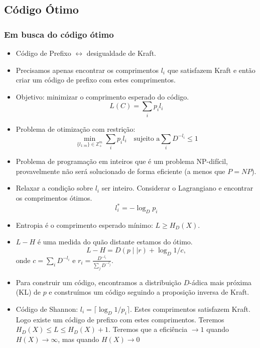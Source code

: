 \subsection{Código Ótimo}

\begin{frame}[allowframebreaks]
  \frametitle{Em busca do código ótimo}
  \begin{itemize}
  \item Código de Prefixo $\leftrightarrow$ desigualdade de Kraft.
  \item Precisamos apenas encontrar os comprimentos $l_i$ que satisfazem Kraft e então
	criar um código de prefixo com estes comprimentos.
  \item Objetivo: minimizar o comprimento esperado do código.
	\begin{equation}
	L(C) = \sum_i p_i l_i
	\end{equation}
  \item Problema de otimização com restrição:
	\begin{equation}
	\min_{ \{ l_{1:m} \} \in \mathbb{Z}_{+}^m  } \sum_i p_i l_i \quad \text{sujeito a} \sum_i D^{-l_i} \leq 1 
	\end{equation}
  \item Problema de programação em inteiros que é um problema NP-difícil, provavelmente não será
	solucionado de forma eficiente (a menos que $P=NP$).
  \item Relaxar a condição sobre $l_i$ ser inteiro. Considerar o Lagrangiano e encontrar os comprimentos ótimos.
	\begin{equation}
	l_i^\ast = -\log_D p_i
	\end{equation}
  \item Entropia é o comprimento esperado mínimo: $L \geq H_D (X)$.
  \item $L-H$ é uma medida do quão distante estamos do ótimo.
	\begin{equation}
	L-H = D(p \mid \mid r) + \log_D 1/c , 
	\end{equation}
	onde $c = \sum_i D^{-l_i}$ e $r_i = \frac{D^{-l_i}}{\sum_j D^{-l_j}}$.
  \item Para construir um código, encontramos a distribuição $D$-ádica mais próxima (KL) de $p$ e construímos
	um código seguindo a proposição inversa de Kraft.
  \item Código de Shannon: $l_i = \lceil \log_D 1/p_i \rceil$. Estes comprimentos satisfazem Kraft. Logo existe
	um código de prefixo com estes comprimentos. Teremos $H_D(X) \leq L \leq H_D(X) + 1$.
	Teremos que a eficiência $\rightarrow 1$ quando $H(X) \rightarrow \infty$, mas quando $H(X) \rightarrow 0$

\end{itemize}
\end{frame}
